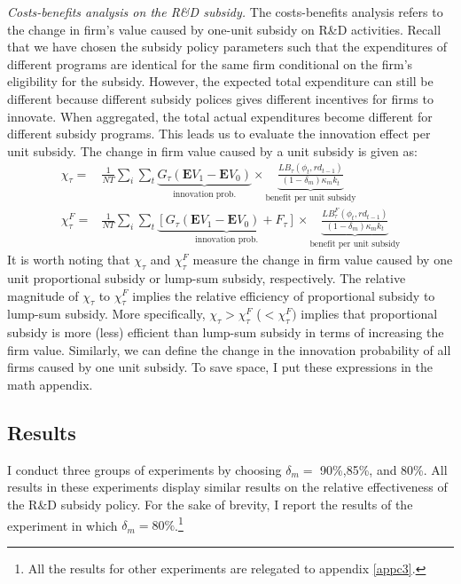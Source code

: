 \documentclass[11pt]{article}
\begin{document}
\textit{Costs-benefits analysis on the R\&D subsidy.} The costs-benefits analysis refers to the change in firm's value caused by one-unit subsidy on R\&D activities. Recall that we have chosen the subsidy policy parameters such that the expenditures of different programs are identical for the same firm conditional on the firm's eligibility for the subsidy. However, the expected total expenditure can still be different because different subsidy polices gives different incentives for firms to innovate. When aggregated, the total actual expenditures become different for different subsidy programs. This leads us to evaluate the innovation effect per unit subsidy. The change in firm value caused by a unit subsidy is given as:
\begin{align}
\chi_\tau=&\frac{1}{NT}\sum_i \sum_t \underbrace{G_\tau(\mathbf{E}V_1-\mathbf{E}V_0)}_\text{innovation prob.}\times \underbrace{\frac{LB_{\tau}(\phi_t, rd_{t-1})}{(1-\delta_m)\kappa_m k_t}}_\text{benefit per unit subsidy} \\ \label{xz}
\chi_{\tau}^F=&\frac{1}{NT}\sum_i\sum_t \underbrace{\left[G_\tau(\mathbf{E}V_1-\mathbf{E}V_0)+F_{\tau} \right]}_\text{innovation prob.} \times \underbrace{\frac{LB_{\tau}^F(\phi_t, rd_{t-1})}{(1-\delta_m)\kappa_m k_t}}_\text{benefit per unit subsidy}
\end{align}
 It is worth noting that $\chi_\tau$ and $\chi_\tau^F$ measure the change in firm value caused by one unit proportional subsidy or lump-sum subsidy, respectively. The relative magnitude of $\chi_\tau$ to $\chi_\tau^F$ implies the relative efficiency of proportional subsidy to lump-sum subsidy. More specifically, $\chi_\tau>\chi_\tau^F$ ($<\chi_\tau^F)$ implies that proportional subsidy is more (less) efficient than lump-sum subsidy in terms of increasing the firm value. Similarly, we can define the change in the innovation probability of all firms caused by one unit subsidy. To save space, I put these expressions in the math appendix. 

\subsection{Results} 
I conduct three groups of experiments by choosing $\delta_{m}=$ 90\%,85\%, and 80\%. All results in these experiments display similar results on the relative effectiveness of the R\&D subsidy policy. For the sake of brevity, I report the results of the experiment in which $\delta_{m}=80\%$.\footnote{All the results for other experiments are relegated to appendix \ref{appc3}.} 
\end{document}
